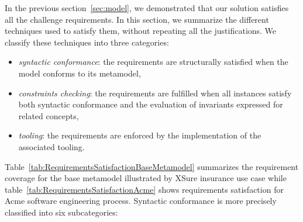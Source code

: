 
In the previous section~\ref{sec:model}, we demonstrated that our solution satisfies all the challenge requirements. In this section, we summarize the different techniques used to satisfy them, without repeating all the justifications. We classify these techniques into three categories:
\begin{itemize}
    \item \emph{syntactic conformance}: the requirements are structurally satisfied when the model conforms to its metamodel,
    \item \emph{constraints checking}: the requirements are fulfilled when all instances satisfy both syntactic conformance and the evaluation of invariants expressed for related concepts,
    \item \emph{tooling}: the requirements are enforced by the implementation of the associated tooling.
\end{itemize}


Table~\ref{tab:RequirementsSatisfactionBaseMetamodel} summarizes the requirement coverage for the base metamodel illustrated by XSure insurance use case while table~\ref{tab:RequirementsSatisfactionAcme} shows requirements satisfaction for Acme software engineering process. Syntactic conformance is more precisely classified into six subcategories:


